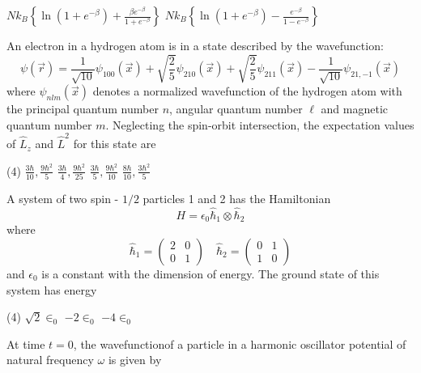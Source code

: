\begin{questions}
\begin{tasks}
	\task[\textbf{C.}] $N k_{B}\left\{\ln \left(1+e^{-\beta}\right)+\frac{\beta e^{-\beta}}{1+e^{-\beta}}\right\}$
	\task[\textbf{D.}] $N k_{B}\left\{\ln \left(1+e^{-\beta}\right)-\frac{e^{-\beta}}{1-e^{-\beta}}\right\}$
\end{tasks}
\begin{minipage}{\textwidth}
	\question An electron in a hydrogen atom is in a state described by the wavefunction:
	$$
	\psi(\vec{r})=\frac{1}{\sqrt{10}} \psi_{100}(\vec{x})+\sqrt{\frac{2}{5}} \psi_{210}(\vec{x})+\sqrt{\frac{2}{5}} \psi_{211}(\vec{x})-\frac{1}{\sqrt{10}} \psi_{21,-1}(\vec{x})
	$$
	where $\psi_{n l m}(\vec{x})$ denotes a normalized wavefunction of the hydrogen atom with the principal quantum number $n$, angular quantum number $\ell$ and magnetic quantum number $m$.
	Neglecting the spin-orbit intersection, the expectation values of $\hat{L}_{z}$ and $\hat{L}^{2}$ for this state are
\end{minipage}
\begin{tasks}(4)
	\task[\textbf{A.}] $\frac{3 \hbar}{10}, \frac{9 \hbar^{2}}{5}$
	\task[\textbf{B.}] $\frac{3 \hbar}{4}, \frac{9 \hbar^{2}}{25}$
	\task[\textbf{C.}]   $\frac{3 \hbar}{5}, \frac{9 \hbar^{2}}{10}$
	\task[\textbf{D.}] $\frac{8 \hbar}{10}, \frac{3 \hbar^{2}}{5}$
\end{tasks}
\begin{minipage}{\textwidth}
	\question A system of two spin - $1 / 2$ particles 1 and 2 has the Hamiltonian
	$$
	H=\epsilon_{0} \hat{\hbar}_{1} \otimes \hat{\hbar}_{2}
	$$
	where
	$$
	\hat{\hbar}_{1}=\left(\begin{array}{ll}
	2 & 0 \\
	0 & 1
	\end{array}\right) \quad \hat{\hbar}_{2}=\left(\begin{array}{ll}
	0 & 1 \\
	1 & 0
	\end{array}\right)
	$$
	and $\epsilon_{0}$ is a constant with the dimension of energy. The ground state of this system has energy
\end{minipage}
\begin{tasks}(4)
	\task[\textbf{A.}] $\sqrt{2} \in_{0}$
	\task[\textbf{C.}] $-2 \in_{0}$
	\task[\textbf{D.}] $-4 \in_{0}$
\end{tasks}
\begin{minipage}{\textwidth}
	\question At time $t=0$, the wavefunctionof a particle in a harmonic oscillator potential of natural frequency $\omega$ is given by

\end{minipage}
\end{questions}

